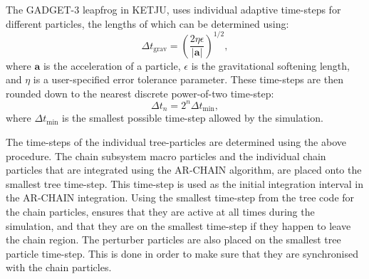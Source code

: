 \documentclass[english, twoside]{HYgradu}
\begin{document}
The GADGET-3 leapfrog in KETJU, uses individual adaptive time-steps for different particles, the lengths of which can be determined using:
\begin{equation}
\Delta t_\mathrm{grav} = \left(\frac{2\eta \epsilon}{|\mathbf{a}|} \right)^{1/2},
\end{equation}
where $\mathbf{a}$ is the acceleration of a particle, $\epsilon$ is the gravitational softening length, and $\eta$ is a user-specified error tolerance parameter. These time-steps are then rounded down to the nearest discrete power-of-two time-step:
\begin{equation}
\Delta t_n = 2^n \Delta t_\mathrm{min},
\end{equation}
where $\Delta t_\mathrm{min}$ is the smallest possible time-step allowed by the simulation. 

The time-steps of the individual tree-particles are determined using the above procedure. The chain subsystem macro particles and the individual chain particles that are integrated using the AR-CHAIN algorithm, are placed onto the smallest tree time-step. This time-step is used as the initial integration interval in the AR-CHAIN integration. Using the smallest time-step from the tree code for the chain particles, ensures that they are active at all times during the simulation, and that they are on the smallest time-step if they happen to leave the chain region. The perturber particles are also placed on the smallest tree particle time-step. This is done in order to make sure that they are synchronised with the chain particles. 



\end{document}
